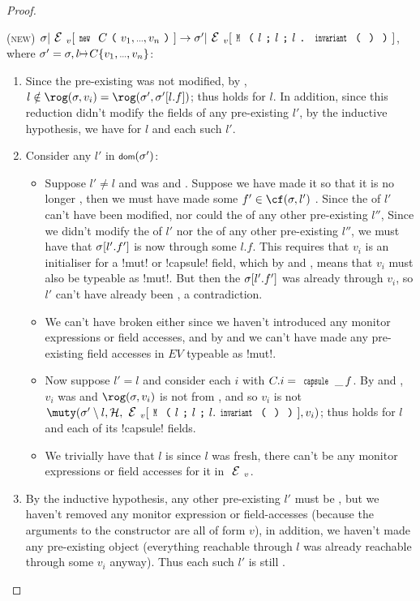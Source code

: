\begin{proof}
\begin{ienumerate}
\item (\textsc{new}) $\s|\EV[\Kw{new}\ C\oR v_1,\ldots,v_n\cR]\rightarrow \s'| \EV[\M{l}{l}{l\singleDot\invariant}]$, where $\s' = \s,l\mapsto C\{v_1,\ldots,v_n\}$:
\begin{enumerate}
	\item Since the pre-existing \s was not modified, by \VS, $l \notin \rog(\s, v_i) = \rog(\s', \s'[l.f])$; thus \CNC holds for $l$. In addition, since this reduction didn't modify the fields of any pre-existing $l'$, by the inductive hypothesis, we have \CNC for $l$ and each such $l'$.
	\item Consider any $l'$ in $\dom(\s')$:
	\begin{itemize}
		\item Suppose $l' \neq l$ and was \WE and \NCM. Suppose we have made it so that it is no longer \WE, then we must have made some $f' \in \cf(\s, l')$ \muty. Since the \rog of $l'$ can't have been modified, nor could the \rog of any other pre-existing $l''$, Since we didn't modify the \rog of $l'$ nor the \rog of any other pre-existing $l''$, 	we must have that $\sigma[l'.f']$ is now \muty through some $l.f$. This requires that $v_i$ is an initialiser for a \Q!mut! or \Q!capsule! field, which by  and , means that $v_i$ must also be typeable as \Q!mut!. But then the $\sigma[l'.f']$ was already \muty through $v_i$, so $l'$ can't have already been \WE, a contradiction.
		\item We can't have broken \NCM either since we haven't introduced any monitor expressions or field accesses, and by  and  we can't have made any pre-existing field accesses in $EV$ typeable as \Q!mut!.
		\item Now suppose $l' = l$ and consider each $i$ with $C.i = \Kw{capsule}\,\_\,f$. By  and , $v_i$ was \encap and $\rog(\s, v_i)$ is not \muty from \EV, and so $v_i$ is not $\muty(\s'\setminus l, \h, \EV[\M{l}{l}{l.\invariant}], v_i)$; thus \WE holds for $l$ and each of its \Q!capsule! fields.
		\item We trivially have that $l$ is \NCM since $l$ was fresh, there can't be any monitor expressions or field accesses for it in $\EV$.	
	\end{itemize}
	\item By the inductive hypothesis, any other pre-existing $l'$ must be \HNO, but we haven't removed any monitor expression or field-accesses (because the arguments to the constructor are all of form $v$), in addition, we haven't made any pre-existing object \reach (everything reachable through $l$ was already reachable through some $v_i$ anyway). Thus each such $l'$ is still \HNO.
\end{enumerate}


\end{ienumerate}
\end{proof}
